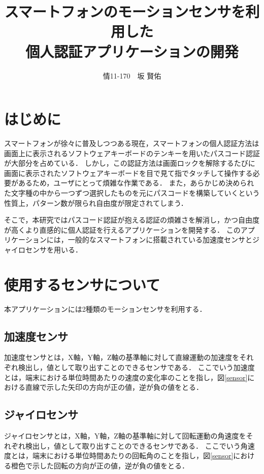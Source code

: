 \documentclass[11pt]{jreport}
\title{\bfseries スマートフォンのモーションセンサを利用した\\個人認証アプリケーションの開発}
\author{情11-170　\UTF{9AD9}坂 賢佑}
\date{}
\begin{document}
\maketitle

\tableofcontents
\listoffigures

\chapter*{はじめに}
スマートフォンが徐々に普及しつつある現在，スマートフォンの個人認証方法は画面上に表示されるソフトウェアキーボードのテンキーを用いたパスコード認証が大部分を占めている．
しかし，この認証方法は画面ロックを解除するたびに画面に表示されたソフトウェアキーボードを目で見て指でタッチして操作する必要があるため，ユーザにとって煩雑な作業である．
また，あらかじめ決められた文字種の中から一つずつ選択したものを元にパスコードを構築していくという性質上，パターン数が限られ自由度が限定されてしまう．

そこで，本研究ではパスコード認証が抱える認証の煩雑さを解消し，かつ自由度が高くより直感的に個人認証を行えるアプリケーションを開発する．
このアプリケーションには，一般的なスマートフォンに搭載されている加速度センサとジャイロセンサを用いる．

\chapter{使用するセンサについて}
本アプリケーションには2種類のモーションセンサを利用する．

	\section{加速度センサ}
	加速度センサとは，X軸，Y軸，Z軸の基準軸に対して直線運動の加速度をそれぞれ検出し，値として取り出すことのできるセンサである．
	ここでいう加速度とは，端末における単位時間あたりの速度の変化率のことを指し，図\ref{sensor}における直線で示した矢印の方向が正の値，逆が負の値をとる．
	
	\section{ジャイロセンサ}
	ジャイロセンサとは，X軸，Y軸，Z軸の基準軸に対して回転運動の角速度をそれぞれ検出し，値として取り出すことのできるセンサである．
    ここでいう角速度とは，端末における単位時間あたりの回転角のことを指し，図\ref{sensor}における橙色で示した回転の方向が正の値，逆が負の値をとる．
\end{document}
